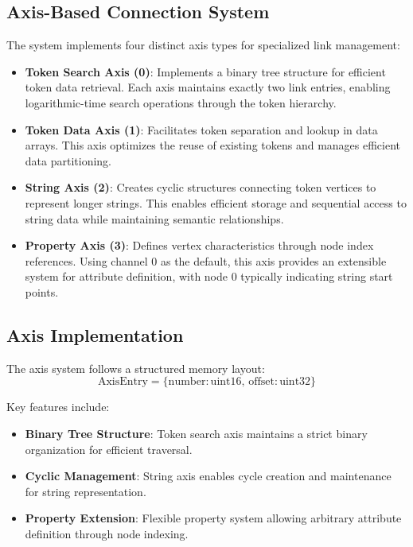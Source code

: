 \documentclass[12pt, a4paper]{article}
\begin{document}
\subsection{Axis-Based Connection System}
The system implements four distinct axis types for specialized link management:
\begin{itemize}
    \item \textbf{Token Search Axis (0)}: Implements a binary tree structure for efficient token data retrieval. Each axis maintains exactly two link entries, enabling logarithmic-time search operations through the token hierarchy.
    
    \item \textbf{Token Data Axis (1)}: Facilitates token separation and lookup in data arrays. This axis optimizes the reuse of existing tokens and manages efficient data partitioning.
    
    \item \textbf{String Axis (2)}: Creates cyclic structures connecting token vertices to represent longer strings. This enables efficient storage and sequential access to string data while maintaining semantic relationships.
    
    \item \textbf{Property Axis (3)}: Defines vertex characteristics through node index references. Using channel 0 as the default, this axis provides an extensible system for attribute definition, with node 0 typically indicating string start points.
\end{itemize}

\subsection{Axis Implementation}
The axis system follows a structured memory layout:
\begin{equation}
    \mathrm{AxisEntry} = \{\mathrm{number}: \mathrm{uint16},\, \mathrm{offset}: \mathrm{uint32}\}
\end{equation}

Key features include:
\begin{itemize}
    \item \textbf{Binary Tree Structure}: Token search axis maintains a strict binary organization for efficient traversal.
    \item \textbf{Cyclic Management}: String axis enables cycle creation and maintenance for string representation.
    \item \textbf{Property Extension}: Flexible property system allowing arbitrary attribute definition through node indexing.
\end{itemize}
\end{document}
